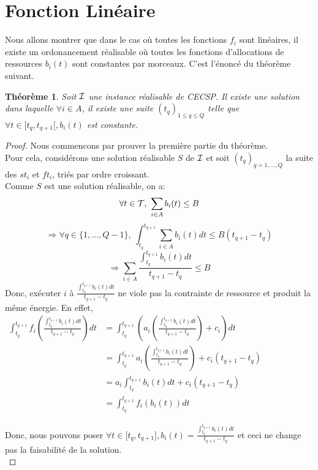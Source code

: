 \documentclass{report}
\newcommand{\inter}[2]{{[}#1,#2{]}}
\newtheorem{Th}{Théorème}
\begin{document}
\section{Fonction Linéaire}

Nous allons montrer que dans le cas où toutes les fonctions $f_i$ sont linéaires, 
il existe un ordonancement réalisable où toutes les fonctions d'allocations de 
ressources $b_i(t)$ sont constantes par morceaux. C'est l'énoncé du théorème 
suivant.

\begin{Th}
	Soit ${\cal I}$ une instance réalisable de CECSP. Il existe une solution dans 
	laquelle $\forall i\in A$, il existe une suite $(t_q)_{1\le q \le Q}$ telle 
	que $\forall t \in {[}t_q,t_{q+1}{[}, b_i(t)$ est constante.\\
\end{Th}

\begin{proof}
	Nous commencons par prouver la première partie du théorème.\\
	Pour cela, considérons une solution réalisable $S$ de ${\cal I}$ et soit 
	$(t_q)_{q=1,\dots ,Q}$ la suite des $st_i$ et $ft_i$, triés par ordre 
	croissant.\\
	Comme $S$ est une solution réalisable, on a: 
	\[\forall t \in {\cal T},\ \sum_{i\in A} b_i(t) \le B\]
	\[ \Rightarrow \forall q \in \{1,\dots , Q-1\},\  
	\int_{t_q}^{t_{q+1}} \sum_{i\in A}b_i(t) dt \le B(t_{q+1} - t_q)\]
	\[ \Rightarrow \sum_{i \in A} \frac{\int_{t_q}^{t_{q+1}} b_i(t)dt}
	{t_{q+1}-t_q} \le B\]
	Donc, exécuter $i$ à $\frac{\int_{t_q}^{t_{q+1}} b_i(t)dt}
	{t_{q+1}-t_q} $ ne viole pas la contrainte de ressource et produit la même
	 énergie. En effet,\\
	$
	\begin{array}{rl}
		\int_{t_q}^{t_{q+1}} f_i \left(\frac{\int_{t_q}^{t_{q+1}} b_i(t) dt}
		{t_{q+1} -t_q}\right) dt & 
		= \int_{t_q}^{t_{q+1}} \left( a_i \left( 
		\frac{\int_{t_q}^{t_{q+1}}b_i(t)dt}{t_{q+1} - t_q}\right) +c_i\right)dt\\
	 	& = \int_{t_q}^{t_{q+1}} a_i \left( \frac{\int_{t_q}^{t_{q+1}}b_i(t)dt}
		{t_{q+1} - t_q}\right) + c_i(t_{q+1} - t_q)\\
	 	& = a_i \int_{t_q}^{t_{q+1}}b_i(t)dt +c_i(t_{q+1} - t_q)\\
	 	& = \int_{t_q}^{t_{q+1}} f_i(b_i(t))dt
	\end{array}
	$

	Donc, nous pouvons poser $\forall t \in \inter{t_q}{t_{q+1}}, b_i(t)=
	\frac{\int_{t_q}^{t_{q+1}}b_i(t)dt}{t_{q+1} - t_q}$ et ceci ne change pas 
	la faisabilité de la solution.\\
\end{proof}
\end{document}

